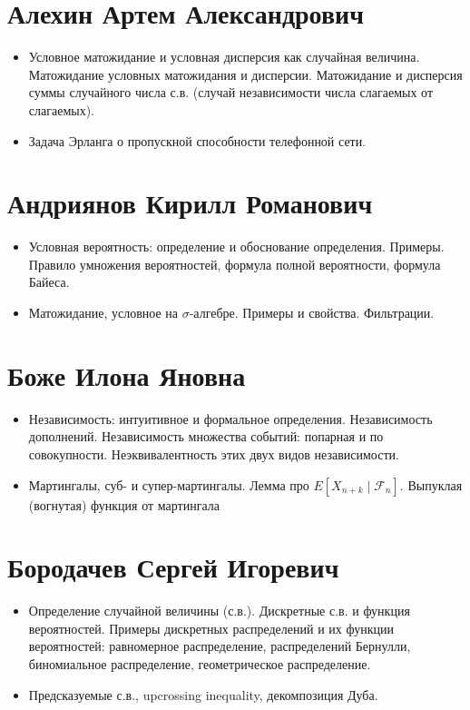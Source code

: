 \documentclass[12pt]{article}
\newcommand\F{\mathcal{F}}
\begin{document}
\section{Алехин Артем Александрович}

\begin{itemize}
  \item Условное матожидание и условная дисперсия как случайная величина. Матожидание условных матожидания и дисперсии. Матожидание и дисперсия суммы случайного числа с.в. (случай независимости числа слагаемых от слагаемых).
  \item Задача Эрланга о пропускной способности телефонной сети.
\end{itemize}

\section{Андриянов Кирилл Романович}

\begin{itemize}
  \item Условная вероятность: определение и обоснование определения. Примеры. Правило умножения вероятностей, формула полной вероятности, формула Байеса.
  \item Матожидание, условное на $\sigma$-алгебре. Примеры и свойства. Фильтрации.
\end{itemize}

\section{Боже Илона Яновна}

\begin{itemize}
  \item Независимость: интуитивное и формальное определения. Независимость дополнений. Независимость множества событий: попарная и по совокупности. Неэквивалентность этих двух видов независимости.
  \item Мартингалы, суб- и супер-мартингалы. Лемма про $E[X_{n + k} \mid \F_n]$. Выпуклая (вогнутая) функция от мартингала
\end{itemize}

\section{Бородачев Сергей Игоревич}

\begin{itemize}
  \item Определение случайной величины (с.в.). Дискретные с.в. и функция вероятностей. Примеры дискретных распределений и их функции вероятностей: равномерное распределение, распределений Бернулли, биномиальное распределение, геометрическое распределение.
  \item Предсказуемые с.в., upcrossing inequality, декомпозиция Дуба.
\end{itemize}
\end{document}
